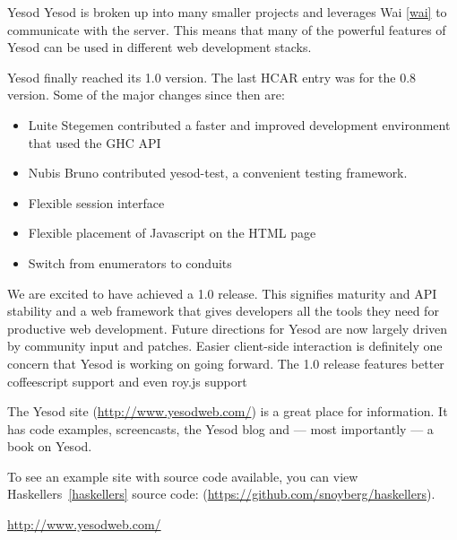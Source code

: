 \begin{hcarentry}{Yesod}
Yesod is broken up into many smaller projects and leverages Wai \cref{wai} to communicate with the server. This means that many of the powerful features of Yesod can be used in different web development stacks.

Yesod finally reached its 1.0 version.  The last HCAR entry was for the 0.8 version. Some of the major changes since then are:

\begin{itemize}
\item Luite Stegemen contributed a faster and improved development environment that used the GHC API
\item Nubis Bruno contributed yesod-test, a convenient testing framework.
\item Flexible session interface
\item Flexible placement of Javascript on the HTML page
\item Switch from enumerators to conduits
\end{itemize}

We are excited to have achieved a 1.0 release. This signifies maturity and API stability and a web framework that gives developers all the tools they need for productive web development. Future directions for Yesod are now largely driven by community input and patches. Easier client-side interaction is definitely one concern that Yesod is working on going forward. The 1.0 release features better coffeescript support and even roy.js support

The Yesod site (\url{http://www.yesodweb.com/}) is a great place for information. It has code examples, screencasts, the Yesod blog and --- most importantly --- a book on Yesod.

To see an example site with source code available, you can view Haskellers~\cref{haskellers} source code: (\url{https://github.com/snoyberg/haskellers}).

\FurtherReading 
\url{http://www.yesodweb.com/} 
\end{hcarentry} 
